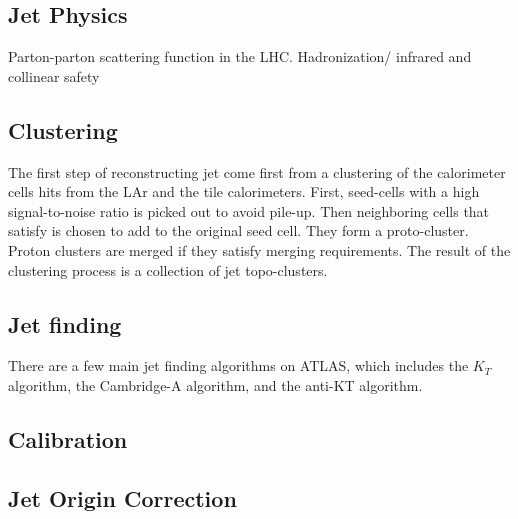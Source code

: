 \subsection{Jet Physics}
Parton-parton scattering function in the LHC. 
Hadronization/ infrared and collinear safety

\subsection{Clustering}
The first step of reconstructing jet come first from a clustering of the calorimeter cells hits from the LAr and the tile calorimeters. First, seed-cells with a high signal-to-noise ratio is picked out to avoid pile-up. Then neighboring cells that satisfy  is chosen to add to the original seed cell. They form a proto-cluster. Proton clusters are merged if they satisfy merging requirements. The result of the clustering process is a collection of jet topo-clusters. 

\subsection{Jet finding}
There are a few main jet finding algorithms on ATLAS, which includes the $K_{T}$ algorithm, the Cambridge-A algorithm, and the anti-KT algorithm. 
\subsection{Calibration}
\subsection{Jet Origin Correction}



